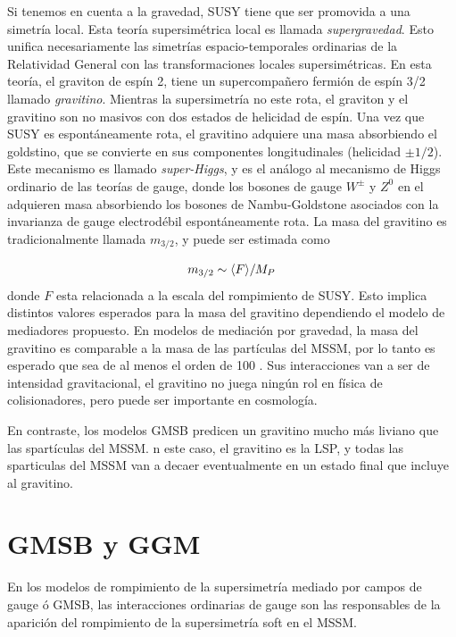 Si tenemos en cuenta a la gravedad, SUSY tiene que ser promovida a una simetría
local. Esta teoría supersimétrica local es llamada \emph{supergravedad}. Esto
unifica necesariamente las simetrías espacio-temporales ordinarias de la
Relatividad General con las transformaciones locales supersimétricas. En esta
teoría, el graviton de espín 2, tiene un supercompa\~nero fermión de espín 3/2
llamado \emph{gravitino}. Mientras la supersimetría no este rota, el graviton y
el gravitino son no masivos con dos estados de helicidad de espín. Una vez que
SUSY es espontáneamente rota, el gravitino adquiere una masa absorbiendo el
goldstino, que se convierte en sus componentes longitudinales (helicidad $\pm
1/2$). Este mecanismo es llamado \emph{super-Higgs}, y es el análogo al
mecanismo de Higgs ordinario de las teorías de gauge, donde los bosones de gauge
$W^\pm$ y $Z^0$ en el {\SM} adquieren masa absorbiendo los bosones de
Nambu-Goldstone asociados con la invarianza de gauge electrodébil
espontáneamente rota. La masa del gravitino es tradicionalmente llamada
$m_{3/2}$, y puede ser estimada como

\begin{equation}
  m_{3/2} \sim \langle F \rangle / M_P
\end{equation}
%
donde $F$ esta relacionada a la escala del rompimiento de SUSY. Esto implica
distintos valores esperados para la masa del gravitino dependiendo el modelo de
mediadores propuesto. En modelos de mediación por gravedad, la masa del
gravitino es comparable a la masa de las partículas del MSSM, por lo tanto es
esperado que sea de al menos el orden de 100 \gev. Sus interacciones van a ser
de intensidad gravitacional, el gravitino no juega ningún rol en física de
colisionadores, pero puede ser importante en cosmología.

En contraste, los modelos GMSB predicen un gravitino mucho más liviano que las
spartículas del MSSM.%
n este caso, el gravitino es
la LSP, y todas las sparticulas del MSSM van a decaer eventualmente en un estado
final que incluye al gravitino.


\section{GMSB y GGM} %

En los modelos de rompimiento de la supersimetría mediado por campos de gauge ó
GMSB, las interacciones ordinarias de gauge son las responsables de la aparición
del rompimiento de la supersimetría soft en el MSSM.

